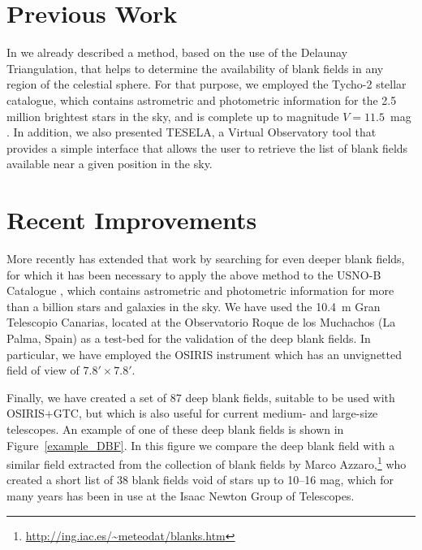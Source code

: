 \section{Previous Work}

In \citet[][hereafter paper~I]{2011MNRAS.417.3061C} \citep[see also contribution in previous ADASS~XXI:][]{2012ASPC..461..173C} we already described a method, based on the use of the Delaunay Triangulation, that helps to determine the availability of blank fields in any region of the celestial sphere. For that purpose, we employed the Tycho-2 stellar catalogue, which contains astrometric and photometric information for the 2.5 million brightest stars in the sky, and is complete up to magnitude $V=11.5$~mag \citep{1997A&A...323L..49P}. In addition, we also presented TESELA, a Virtual Observatory tool that provides a simple interface that allows the user to retrieve the list of blank fields available near a given position in the sky.

\section{Recent Improvements}

More recently \citep[][hereafter paper~II]{2012arXiv1209.4861J} has extended that work by searching for even deeper blank fields, for which it has been necessary to apply the above method to the USNO-B Catalogue \citep{2003AJ....125..984M}, which contains astrometric and photometric information for more than a billion stars and galaxies in the sky. We have used the 10.4~m Gran Telescopio Canarias, located at the Observatorio Roque de los Muchachos (La Palma, Spain) as a test-bed for the validation of the deep blank fields. In particular, we have employed the OSIRIS instrument \citep{2000SPIE.4008..623C} which has an unvignetted field of view of $7.8'\times 7.8'$. 

Finally, we have created a set of 87 deep blank fields, suitable to be used with OSIRIS+GTC, but which is also useful for current medium- and large-size telescopes. An example of one of these deep blank fields is shown in Figure~\ref{example_DBF}. In this figure we compare the deep blank field with a similar field extracted from the collection of blank fields by Marco Azzaro,\footnote{\url{http://ing.iac.es/~meteodat/blanks.htm}} who created a short list of 38 blank fields void of stars up to 10--16 mag, which for many years has been in use at the Isaac Newton Group of Telescopes.

